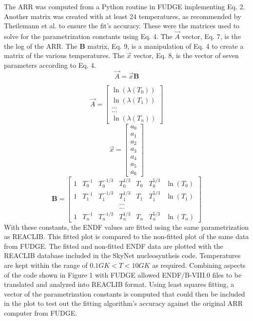 \documentclass{article}
\begin{document}
The ARR was computed from a Python routine in FUDGE implementing Eq. 2. Another matrix was created with at least 24 temperatures, as recommended by Theilemann et al. to ensure the fit's accuracy.\cite{parameter} These were the matrices used to solve for the parametrization constants using Eq. 4. The $\vec{A}$ vector, Eq. 7, is the the log of the ARR. The $\mathbf{B}$ matrix, Eq. 9, is a manipulation of Eq. 4 to create a matrix of the various temperatures. The $\vec{x}$ vector, Eq. 8, is the vector of seven parameters according to Eq. 4. 
\begin{equation}
 \vec{A}=\vec{x}\mathbf{B} \end{equation}
 
 \begin{equation}
\vec{A}=\begin{bmatrix} 
    {\ln(\lambda (T_0))}\\\ln(\lambda(T_1))\\  ... \\... \\\ln(\lambda (T_n))\label{eq:3} \end{bmatrix}
     \end{equation}
\begin{equation}
 \vec{x}=\begin{bmatrix}
 {a_0}\\{a_1}\\{a_2}\\{a_3}\\{a_4}\\{a_5}\\{a_6}
 \end{bmatrix}
 \end{equation}
 \begin{equation}
 \boldsymbol{B}=\begin{bmatrix} {1} &{T_0^{-1}} &{T_0^{-1/3}} & {T_0^{1/3}} & {T_0} & {T_0^{5/3}} & {\ln(T_0)} \\ {1} &{T_1^{-1}} &{T_1^{-1/3}} & {T_1^{1/3}} & {T_1} & {T_1^{5/3}} &  {\ln(T_1)} \\ {}&{}&{}&... \\ {}&{}&{}&... \\ {1} &{T_n^{-1}} &{T_n^{-1/3}} & {T_n^{1/3}} & {T_n} & {T_n^{5/3}} & {\ln(T_n)}
 \end{bmatrix}  
\end{equation}
With these constants, the ENDF values are fitted using the same parametrization as REACLIB. This fitted plot is compared to the non-fitted plot of the same data from FUDGE. The fitted and non-fitted ENDF data are plotted with the REACLIB database included in the SkyNet nucleosyntheis code.\cite{SkyNet} Temperatures are kept within the range of $0.1GK<T<10GK$ as required. Combining aspects of the code shown in Figure 1 with FUDGE allowed ENDF/B-VIII.0 files to be translated and analyzed into REACLIB format. Using least squares fitting, a vector of the parametrization constants is computed that could then be included in the plot to test out the fitting algorithm’s accuracy against the original ARR computer from FUDGE. \cite{fudge}
\end{document}
